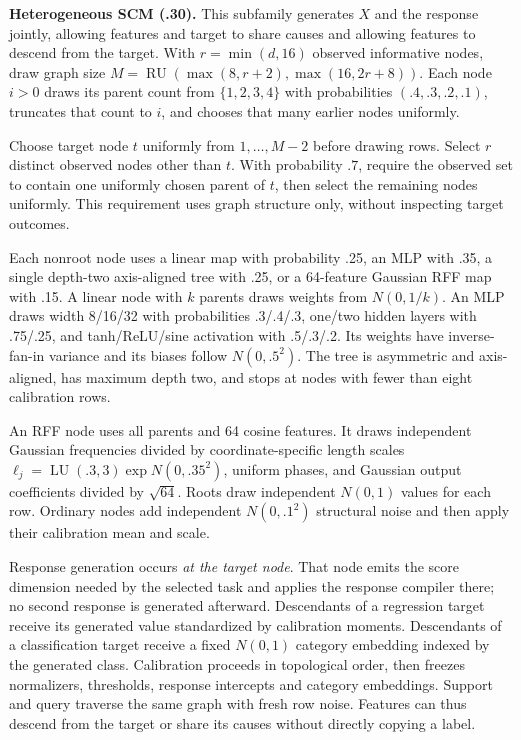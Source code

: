 \documentclass[11pt]{article}
\begin{document}
\textbf{Heterogeneous SCM (.30).} This subfamily generates $X$ and the response jointly, allowing features and target to share causes and allowing features to descend from the target. With $r=\min(d,16)$ observed informative nodes, draw graph size $M=\operatorname{RU}(\max(8,r+2),\max(16,2r+8))$. Each node $i>0$ draws its parent count from $\{1,2,3,4\}$ with probabilities $(.4,.3,.2,.1)$, truncates that count to $i$, and chooses that many earlier nodes uniformly.

Choose target node $t$ uniformly from $1,\ldots,M-2$ before drawing rows. Select $r$ distinct observed nodes other than $t$. With probability $.7$, require the observed set to contain one uniformly chosen parent of $t$, then select the remaining nodes uniformly. This requirement uses graph structure only, without inspecting target outcomes.

Each nonroot node uses a linear map with probability .25, an MLP with .35, a single depth-two axis-aligned tree with .25, or a 64-feature Gaussian RFF map with .15. A linear node with $k$ parents draws weights from $N(0,1/k)$. An MLP draws width 8/16/32 with probabilities .3/.4/.3, one/two hidden layers with .75/.25, and tanh/ReLU/sine activation with .5/.3/.2. Its weights have inverse-fan-in variance and its biases follow $N(0,.5^2)$. The tree is asymmetric and axis-aligned, has maximum depth two, and stops at nodes with fewer than eight calibration rows.

An RFF node uses all parents and 64 cosine features. It draws independent Gaussian frequencies divided by coordinate-specific length scales $\ell_j=\operatorname{LU}(.3,3)\exp N(0,.35^2)$, uniform phases, and Gaussian output coefficients divided by $\sqrt{64}$. Roots draw independent $N(0,1)$ values for each row. Ordinary nodes add independent $N(0,.1^2)$ structural noise and then apply their calibration mean and scale.

Response generation occurs \emph{at the target node}. That node emits the score dimension needed by the selected task and applies the response compiler there; no second response is generated afterward. Descendants of a regression target receive its generated value standardized by calibration moments. Descendants of a classification target receive a fixed $N(0,1)$ category embedding indexed by the generated class. Calibration proceeds in topological order, then freezes normalizers, thresholds, response intercepts and category embeddings. Support and query traverse the same graph with fresh row noise. Features can thus descend from the target or share its causes without directly copying a label.
\end{document}
